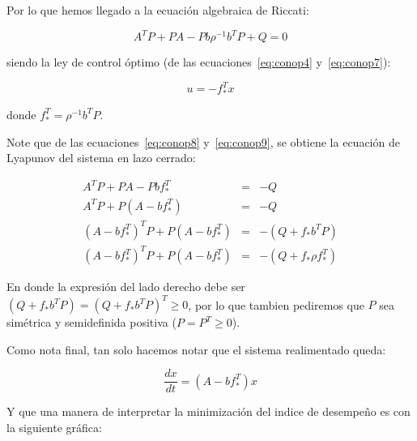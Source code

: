     Por lo que hemos llegado a la ecuación algebraica de Riccati:

    \begin{equation} \label{eq:conop8}
        A^T P + P A - P b \rho^{-1} b^T P + Q = 0
    \end{equation}

    siendo la ley de control óptimo (de las ecuaciones~\ref{eq:conop4} y~\ref{eq:conop7}):

    \begin{equation} \label{eq:conop9}
        u = -f_*^T x
    \end{equation}

    donde $f_*^T = \rho^{-1} b^T P$.

    Note que de las ecuaciones~\ref{eq:conop8} y~\ref{eq:conop9}, se obtiene la ecuación de Lyapunov del sistema en lazo cerrado:

    \begin{eqnarray}
        A^T P + P A - P b f_*^T & = & -Q \nonumber \\
        A^T P + P \left( A - b f_*^T \right) & = & - Q \nonumber \\
        \left( A - b f_*^T \right)^T P + P \left( A - b f_*^T \right) & = & - \left( Q + f_* b^T P \right) \nonumber \\
        \left( A - b f_*^T \right)^T P + P \left( A - b f_*^T \right) & = & - \left( Q + f_* \rho f_*^T \right)
    \end{eqnarray}

    En donde la expresión del lado derecho debe ser $\left( Q + f_* b^T P \right) = \left( Q + f_* b^T P \right)^T \ge 0$, por lo que tambien pediremos que $P$ sea simétrica y semidefinida positiva ($P = P^T \ge 0$).

    Como nota final, tan solo hacemos notar que el sistema realimentado queda:

    \begin{equation} \label{eq:conop12}
        \frac{dx}{dt} = (A - b f_*^T) x
    \end{equation}

    Y que una manera de interpretar la minimización del indice de desempeño es con la siguiente gráfica:

